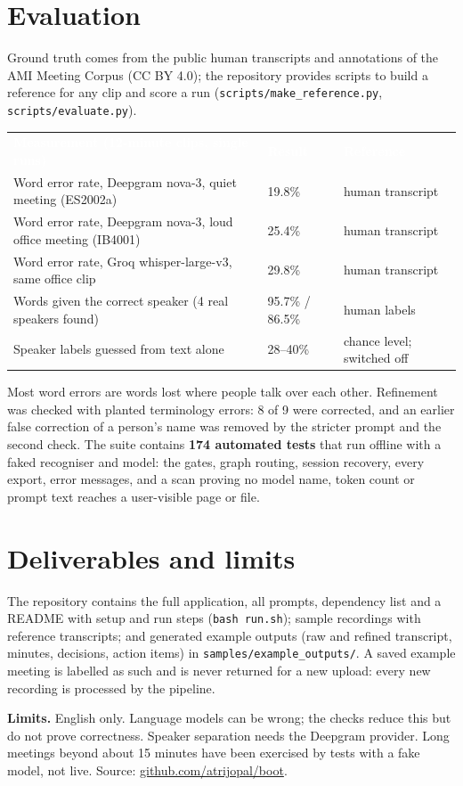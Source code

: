 \documentclass[10pt,a4paper]{article}
\newcommand{\code}[1]{\texttt{\small #1}}
\newcommand{\HC}[1]{\textcolor{white}{\textbf{#1}}}
\begin{document}
\section{Evaluation}
Ground truth comes from the public human transcripts and annotations of the AMI Meeting Corpus (CC BY 4.0); the repository provides scripts to build a reference for any clip and score a run (\code{scripts/make\_reference.py}, \code{scripts/evaluate.py}).
\begin{center}
\begin{tabularx}{0.98\textwidth}{@{}Y l l@{}}
\HC{Measurement (12-minute clips, single runs)}&\HC{Result}&\HC{Reference}\\
Word error rate, Deepgram nova-3, quiet meeting (ES2002a) & 19.8\% & human transcript\\
Word error rate, Deepgram nova-3, loud office meeting (IB4001) & 25.4\% & human transcript\\
Word error rate, Groq whisper-large-v3, same office clip & 29.8\% & human transcript\\
Words given the correct speaker (4 real speakers found) & 95.7\% / 86.5\% & human labels\\
Speaker labels guessed from text alone & 28--40\% & chance level; switched off\\
\end{tabularx}
\end{center}
Most word errors are words lost where people talk over each other. Refinement was checked with planted terminology errors: 8 of 9 were corrected, and an earlier false correction of a person's name was removed by the stricter prompt and the second check. The suite contains \textbf{174 automated tests} that run offline with a faked recogniser and model: the gates, graph routing, session recovery, every export, error messages, and a scan proving no model name, token count or prompt text reaches a user-visible page or file.

\section{Deliverables and limits}
The repository contains the full application, all prompts, dependency list and a README with setup and run steps (\code{bash run.sh}); sample recordings with reference transcripts; and generated example outputs (raw and refined transcript, minutes, decisions, action items) in \code{samples/example\_outputs/}. A saved example meeting is labelled as such and is never returned for a new upload: every new recording is processed by the pipeline.

\textbf{Limits.} English only. Language models can be wrong; the checks reduce this but do not prove correctness. Speaker separation needs the Deepgram provider. Long meetings beyond about 15 minutes have been exercised by tests with a fake model, not live. Source: \href{https://github.com/atrijopal/boot}{\textcolor{brand}{github.com/atrijopal/boot}}.
\end{document}
